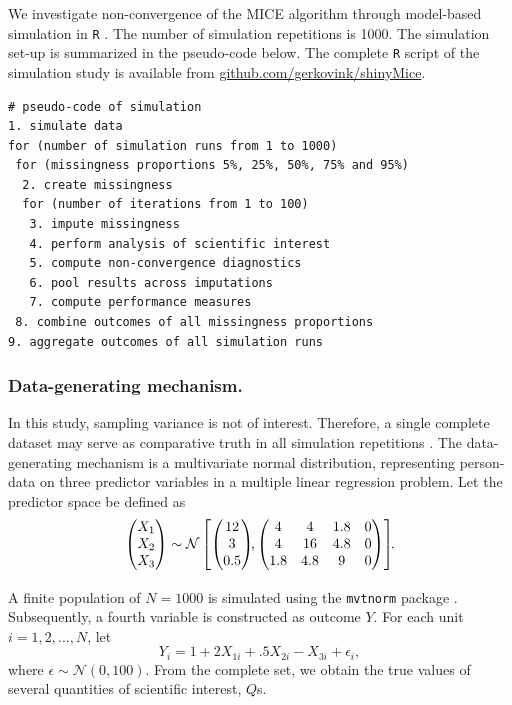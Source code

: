 \documentclass[Royal,times,sageh]{sagej}
\begin{document}
We investigate non-convergence of the MICE algorithm through model-based simulation in \texttt{R} \citep[version 3.6.3;][]{R}. The number of simulation repetitions is 1000. The simulation set-up is summarized in the pseudo-code below. The complete \texttt{R} script of the simulation study is available from \href{https://github.com/gerkovink/shinyMice/tree/master/3.Thesis/1.SimulationStudy}{github.com/gerkovink/shinyMice}.

\begin{verbatim}
# pseudo-code of simulation 
1. simulate data 
for (number of simulation runs from 1 to 1000)
 for (missingness proportions 5%, 25%, 50%, 75% and 95%)
  2. create missingness
  for (number of iterations from 1 to 100)
   3. impute missingness
   4. perform analysis of scientific interest
   5. compute non-convergence diagnostics 
   6. pool results across imputations
   7. compute performance measures
 8. combine outcomes of all missingness proportions
9. aggregate outcomes of all simulation runs 
\end{verbatim}

\hypertarget{data-generating-mechanism.}{%
\subsubsection{Data-generating mechanism.}\label{data-generating-mechanism.}}

In this study, sampling variance is not of interest. Therefore, a single complete dataset may serve as comparative truth in all simulation repetitions \citep{vink14}. The data-generating mechanism is a multivariate normal distribution, representing person-data on three predictor variables in a multiple linear regression problem. Let the predictor space be defined as
\[
\begin{aligned}
\begin{pmatrix}X_1\\
X_2\\
X_3
\end{pmatrix} \sim \mathcal{N}
\begin{bmatrix}
\begin{pmatrix}
12\\
3\\
0.5
\end{pmatrix}\!\!,
\begin{pmatrix}
4 & 4 & 1.8 & 0\\
4 & 16 & 4.8 & 0\\
1.8 & 4.8 & 9 & 0
\end{pmatrix}
\end{bmatrix}\!\!\text{.}\\[2\jot]
\end{aligned}
\]
A finite population of \(N=1000\) is simulated using the \texttt{mvtnorm} package \citep{mvtnorm}. Subsequently, a fourth variable is constructed as outcome \(Y\). For each unit \(i = 1, 2,..., N\), let
\[
Y_i = 1 + 2X_{1i} +.5X_{2i} - X_{3i} + \epsilon_i ,
\]
where \(\epsilon \sim \mathcal{N}(0, 100)\). From the complete set, we obtain the true values of several quantities of scientific interest, \(Q\)s.
\end{document}
